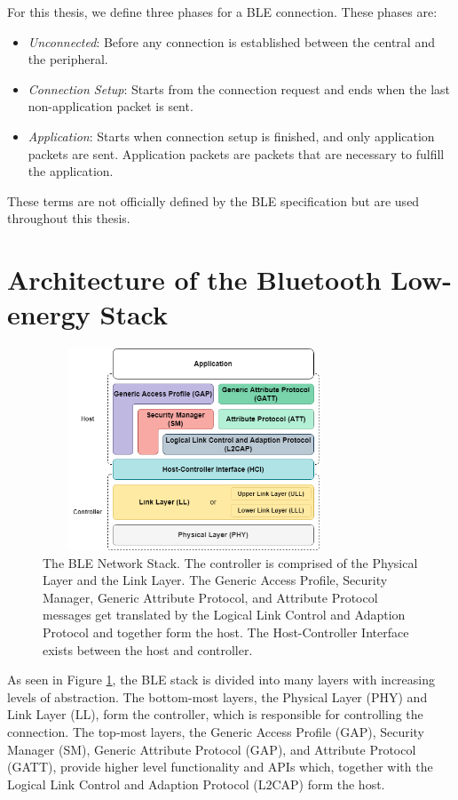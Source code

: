 For this thesis, we define three phases for a BLE connection. These phases are:
\begin{itemize}
    \item \textit{Unconnected}: Before any connection is established between the central and the peripheral.
    \item \textit{Connection Setup}: Starts from the connection request and ends when the last non-application packet is sent. 
    \item \textit{Application}: Starts when connection setup is finished, and only application packets are sent. Application packets are packets that are necessary to fulfill the application. 
\end{itemize}
These terms are not officially defined by the BLE specification but are used throughout this thesis. 

\section{Architecture of the Bluetooth Low-energy Stack}
\begin{figure}[]
    \centering
    \includegraphics[width=0.8\textwidth,height=6cm,keepaspectratio=true]{images/ble_stack/ble_stack.drawio.png}
    \caption{
        The BLE Network Stack. The controller is comprised of the Physical Layer and the Link Layer. The Generic Access Profile, Security Manager, Generic Attribute Protocol, and Attribute Protocol messages get translated by the Logical Link Control and Adaption Protocol and together form the host. The Host-Controller Interface exists between the host and controller.
    }
    \label{fig:ble_stack}
\end{figure}

As seen in Figure \ref{fig:ble_stack}, the BLE stack is divided into many layers with increasing levels of abstraction. The bottom-most layers, the Physical Layer (PHY) and Link Layer (LL), form the controller, which is responsible for controlling the connection. The top-most layers, the Generic Access Profile (GAP), Security Manager (SM), Generic Attribute Protocol (GAP), and Attribute Protocol (GATT), provide higher level functionality and APIs which, together with the Logical Link Control and Adaption Protocol (L2CAP) form the host.

